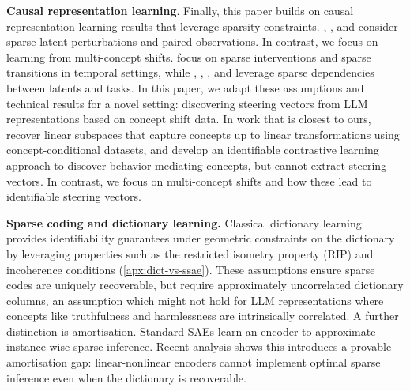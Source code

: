 \documentclass{article}
\begin{document}
\textbf{Causal representation learning}. Finally, this paper builds on causal representation learning results that leverage sparsity constraints. \citet{ahuja2022weakly}, \citet{locatello2020weakly}, and \citet{brehmer2022weaklysupervisedcausalrepresentation} consider sparse latent perturbations and paired observations. In contrast, we focus on learning from multi-concept shifts. \citet{lachapelle2022disentanglement} focus on sparse interventions and sparse transitions in temporal settings, while \citet{lachapelle2023synergies}, \citet{layne2024sparsityregularizationtreestructuredenvironments}, \citet{xu2024sparsityprinciplepartiallyobservable}, and \citet{fumero2023leveragingsparsesharedfeature} leverage sparse dependencies between latents and tasks. In this paper, we adapt these assumptions and technical results for a novel setting: discovering steering vectors from LLM representations based on concept shift data. 
In work that is closest to ours, \citet{rajendran2024learning} recover linear subspaces that capture concepts up to linear transformations using concept-conditional datasets, and \citet{goyal2025causaldifferentiating} develop an identifiable contrastive learning approach to discover behavior-mediating concepts, but cannot extract steering vectors.
In contrast, we focus on multi-concept shifts and how these lead to identifiable steering vectors. 

\textbf{Sparse coding and dictionary learning.} Classical dictionary learning provides identifiability guarantees under geometric constraints on the dictionary by leveraging properties such as the restricted isometry property (RIP) \citep{candes2005decodinglinearprogramming, baraniuk2008simple} and incoherence conditions \citep{donoho2003optimally, gribonval2015sample} (\cref{apx:dict-vs-ssae}). These assumptions ensure sparse codes are uniquely recoverable, but require approximately uncorrelated dictionary columns, an assumption which might not hold for LLM representations where concepts like truthfulness and harmlessness are intrinsically correlated. A further distinction is amortisation. Standard SAEs learn an encoder to approximate instance-wise sparse inference. Recent analysis \citep{oneill2025computeoptimalinferenceprovable} shows this introduces a provable amortisation gap: linear-nonlinear encoders cannot implement optimal sparse inference even when the dictionary is recoverable.
\end{document}
